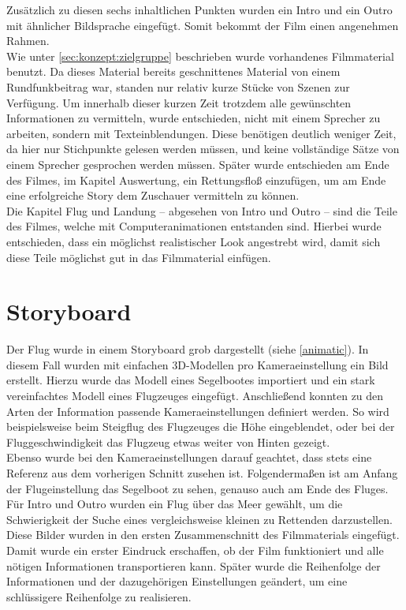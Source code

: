 Zusätzlich zu diesen sechs inhaltlichen Punkten wurden ein Intro und ein Outro mit ähnlicher Bildsprache eingefügt. Somit bekommt der Film einen angenehmen Rahmen.\\
Wie unter \autoref{sec:konzept:zielgruppe} beschrieben wurde vorhandenes Filmmaterial benutzt. Da dieses Material bereits geschnittenes Material von einem Rundfunkbeitrag war, standen nur relativ kurze Stücke von Szenen zur Verfügung. Um innerhalb dieser kurzen Zeit trotzdem alle gewünschten Informationen zu vermitteln, wurde entschieden, nicht mit einem Sprecher zu arbeiten, sondern mit Texteinblendungen. Diese benötigen deutlich weniger Zeit, da hier nur Stichpunkte gelesen werden müssen, und keine vollständige Sätze von einem Sprecher gesprochen werden müssen.
Später wurde entschieden am Ende des Filmes, im Kapitel Auswertung, ein Rettungsfloß einzufügen, um am Ende eine erfolgreiche Story dem Zuschauer vermitteln zu können.\\
Die Kapitel Flug und Landung -- abgesehen von Intro und Outro -- sind die Teile des Filmes, welche mit Computeranimationen entstanden sind. Hierbei wurde entschieden, dass ein möglichst realistischer Look angestrebt wird, damit sich diese Teile möglichst gut in das Filmmaterial einfügen.

\section{Storyboard} %
\label{sec:konzept:animatic}

Der Flug wurde in einem Storyboard grob dargestellt (siehe \autoref{animatic}). In diesem Fall wurden mit einfachen 3D-Modellen pro Kameraeinstellung ein Bild erstellt. Hierzu wurde das Modell eines Segelbootes importiert und ein stark vereinfachtes Modell eines Flugzeuges eingefügt. Anschließend konnten zu den Arten der Information passende Kameraeinstellungen definiert werden. So wird beispielsweise beim Steigflug des Flugzeuges die Höhe eingeblendet, oder bei der Fluggeschwindigkeit das Flugzeug etwas weiter von Hinten gezeigt. \\
Ebenso wurde bei den Kameraeinstellungen darauf geachtet, dass stets eine Referenz aus dem vorherigen Schnitt zusehen ist. Folgendermaßen ist am Anfang der Flugeinstellung das Segelboot zu sehen, genauso auch am Ende des Fluges.\\
Für Intro und Outro wurden ein Flug über das Meer gewählt, um die Schwierigkeit der Suche eines vergleichsweise kleinen zu Rettenden darzustellen.
Diese Bilder wurden in den ersten Zusammenschnitt des Filmmaterials eingefügt. Damit wurde ein erster Eindruck erschaffen, ob der Film funktioniert und alle nötigen Informationen transportieren kann. Später wurde die Reihenfolge der Informationen und der dazugehörigen Einstellungen geändert, um eine schlüssigere Reihenfolge zu realisieren.


